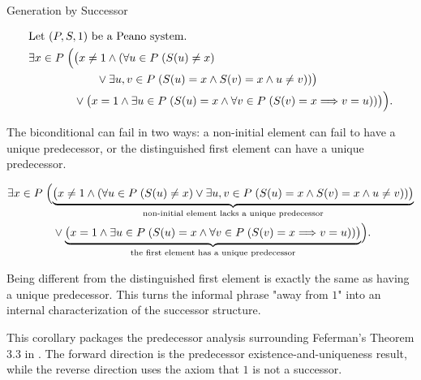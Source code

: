 \begin{topicbox}{Generation by Successor}
\begin{remark*}
\[
\begin{aligned}
&\text{Let } (P,S,1) \text{ be a Peano system.}\\
&\exists x \in P\;\Bigl(
\bigl(x\neq 1 \land
(\forall u \in P\;(S(u)\neq x)\\
&\qquad\qquad\qquad\lor
\exists u,v \in P\;(S(u)=x \land S(v)=x \land u\neq v))\bigr)\\
&\qquad\qquad\lor
\bigl(x=1 \land \exists u \in P\;(S(u)=x \land
\forall v \in P\;(S(v)=x \Longrightarrow v=u))\bigr)
\Bigr).
\end{aligned}
\]
\end{remark*}

\begin{remark*}
The biconditional can fail in two ways: a non-initial element can fail to have
a unique predecessor, or the distinguished first element can have a unique
predecessor.
\end{remark*}

\begin{remark*}
\[
\begin{aligned}
&\exists x \in P\;\Bigl(
\underbrace{\bigl(x\neq 1 \land
(\forall u \in P\;(S(u)\neq x)
\lor
\exists u,v \in P\;(S(u)=x \land S(v)=x \land u\neq v))\bigr)}_
{\text{non-initial element lacks a unique predecessor}}\\
&\qquad\qquad\lor
\underbrace{\bigl(x=1 \land \exists u \in P\;(S(u)=x \land
\forall v \in P\;(S(v)=x \Longrightarrow v=u))\bigr)}_
{\text{the first element has a unique predecessor}}
\Bigr).
\end{aligned}
\]
\end{remark*}

\begin{remark*}[Interpretation]
Being different from the distinguished first element is exactly the same as
having a unique predecessor. This turns the informal phrase "away from $1$"
into an internal characterization of the successor structure.
\end{remark*}

\begin{remark*}
This corollary packages the predecessor analysis surrounding Feferman's
Theorem 3.3 in \citet{FefermanNumberSystems1964}. The forward direction is
the predecessor existence-and-uniqueness result, while the reverse direction
uses the axiom that $1$ is not a successor.
\end{remark*}


\end{topicbox}
